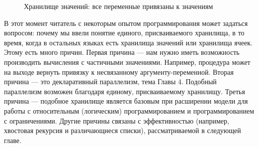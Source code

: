 \begin{figure}
\caption{Хранилище значений: все переменные привязаны к значениям}
\label{figure:all_variables_bound_to_values}
\end{figure}




В этот момент читатель с некоторым опытом программирования может задаться вопросом: почему мы ввели понятие единого, присваиваемого хранилища, в то время, когда в остальных языках есть хранилища значений или хранилища ячеек. Этому есть много причин. Первая причина --- нам нужно иметь возможность производить вычисления с частичными значениями. Например, процедура может на выходе вернуть привязку к несвязанному аргументу-переменной. Вторая причина --- это декларативный параллелизм, тема Главы 4. Подобный параллелизм возможен благодаря единому, присваиваемому хранилищу. Третья причина --- подобное хранилище является базовым при расширении модели для работы с относительным (логическим) программированием и программированием с ограничениями. Другие причины связаны с эффективностью (например, хвостовая рекурсия и различающиеся списки), рассматриваемой в следующей главе.


